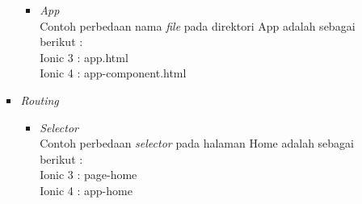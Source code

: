 \begin{enumerate}
\begin{enumerate}
\begin{itemize}
\begin{itemize}
				\item {\it App} \\
				Contoh perbedaan nama {\it file} pada direktori App adalah sebagai berikut : \\
				Ionic 3 : app.html \\
				Ionic 4 : app-component.html
			\end{itemize}

			\item {\it Routing} \\
			\begin{itemize}
				\item {\it Selector} \\
				Contoh perbedaan {\it selector} pada halaman Home adalah sebagai berikut :\\
				Ionic 3 : page-home  \\
				Ionic 4 : app-home
			\end{itemize}
			
		\end{itemize}


\end{enumerate}
\end{enumerate}
